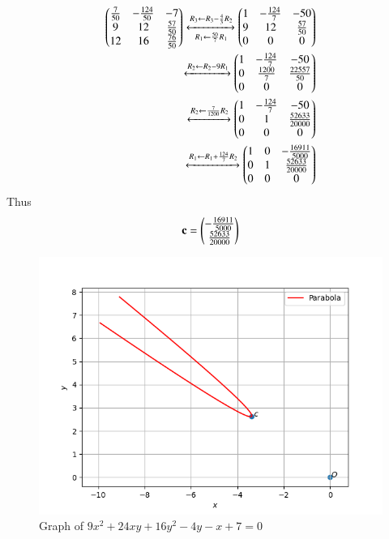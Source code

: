 \documentclass[journal,12pt,twocolumn]{IEEEtran}
\begin{document}
\begin{align*}
    \begin{pmatrix}\frac{7}{50}&-\frac{124}{50}&-7\\9&12&\frac{57}{50}\\12&16&\frac{76}{50}\end{pmatrix}\xleftrightarrow[R_1\leftarrow \frac{50}{7}R_1]{R_3\leftarrow R_3-\frac{4}{3}R_2}\begin{pmatrix}1&-\frac{124}{7}&-50\\9&12&\frac{57}{50}\\0&0&0\end{pmatrix}\\
    \xleftrightarrow{R_2\leftarrow R_2-9R_1}\begin{pmatrix}1&-\frac{124}{7}&-50\\0&\frac{1200}{7}&\frac{22557}{50}\\0&0&0\end{pmatrix}\\
    \xleftrightarrow{R_2\leftarrow\frac{7}{1200}R_2}\begin{pmatrix}1&-\frac{124}{7}&-50\\0&1&\frac{52633}{20000}\\0&0&0\end{pmatrix}\\
    \xleftrightarrow{R_1\leftarrow R_1+\frac{124}{7}R_2}\begin{pmatrix}1&0&-\frac{16911}{5000}\\0&1&\frac{52633}{20000}\\0&0&0\end{pmatrix}
\end{align*}
Thus
\begin{align}
    \mathbf{c} = \begin{pmatrix}-\frac{16911}{5000}\\\frac{52633}{20000}\end{pmatrix}
\end{align}
\renewcommand{\thefigure}{\arabic{figure}}
  \begin{figure}[!ht]
        \centering
        \includegraphics[width=\columnwidth]{parab.png}
        \caption{Graph of $9x^2+24xy+16y^2-4y-x+7=0$}
        \label{myfig}
\end{figure}
\end{document}
